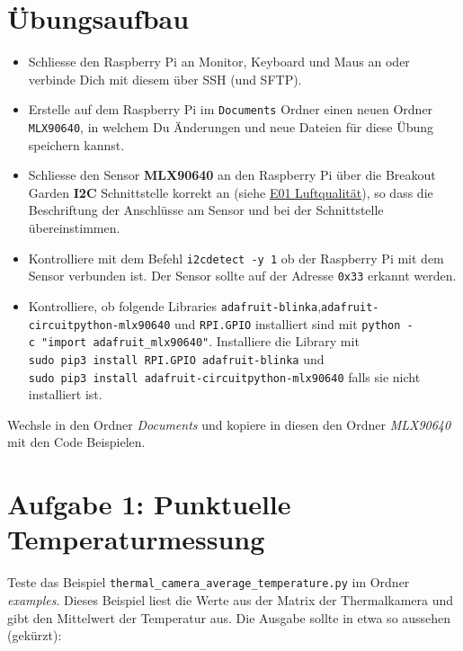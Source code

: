 \documentclass[
  11pt,
  a4paper,
  oneside, openany  ,captions=tableheading
]{scrbook}
\providecommand{\tightlist}{%
  \setlength{\itemsep}{0pt}\setlength{\parskip}{0pt}}
\theoremstyle{remark}
\renewcommand{\markright}[1]{\def\chaptertitle{#1}} %
\begin{document}
\section*{Übungsaufbau}\label{uxfcbungsaufbau-4}

\markright{Übungsaufbau}

\begin{itemize}
\tightlist
\item
  Schliesse den Raspberry Pi an Monitor, Keyboard und Maus an oder
  verbinde Dich mit diesem über SSH (und SFTP).
\item
  Erstelle auf dem Raspberry Pi im \texttt{Documents} Ordner einen neuen
  Ordner \texttt{MLX90640}, in welchem Du Änderungen und neue Dateien
  für diese Übung speichern kannst.
\item
  Schliesse den Sensor \textbf{MLX90640} an den Raspberry Pi über die
  Breakout Garden \textbf{I2C} Schnittstelle korrekt an (siehe
  \href{E01_Luftqualitaet.qmd}{E01 Luftqualität}), so dass die
  Beschriftung der Anschlüsse am Sensor und bei der Schnittstelle
  übereinstimmen.
\item
  Kontrolliere mit dem Befehl \texttt{i2cdetect\ -y\ 1} ob der Raspberry
  Pi mit dem Sensor verbunden ist. Der Sensor sollte auf der Adresse
  \texttt{0x33} erkannt werden.
\item
  Kontrolliere, ob folgende Libraries
  \texttt{adafruit-blinka},\texttt{adafruit-circuitpython-mlx90640} und
  \texttt{RPI.GPIO} installiert sind mit
  \texttt{python\ -c\ "import\ adafruit\_mlx90640"}. Installiere die
  Library mit \texttt{sudo\ pip3\ install\ RPI.GPIO\ adafruit-blinka}
  und \texttt{sudo\ pip3\ install\ adafruit-circuitpython-mlx90640}
  falls sie nicht installiert ist.
\end{itemize}

Wechsle in den Ordner \emph{Documents} und kopiere in diesen den Ordner
\emph{MLX90640} mit den Code Beispielen.

\section*{Aufgabe 1: Punktuelle
Temperaturmessung}\label{aufgabe-1-punktuelle-temperaturmessung}

\markright{Aufgabe 1: Punktuelle Temperaturmessung}

Teste das Beispiel \texttt{thermal\_camera\_average\_temperature.py} im
Ordner \emph{examples}. Dieses Beispiel liest die Werte aus der Matrix
der Thermalkamera und gibt den Mittelwert der Temperatur aus. Die
Ausgabe sollte in etwa so aussehen (gekürzt):
\end{document}
